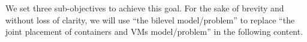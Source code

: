  We set three sub-objectives to achieve this goal. 
For the sake of brevity and without loss of clarity, we will use ``the bilevel model/problem'' to replace ``the joint placement of containers and VMs model/problem'' in the following content. 

